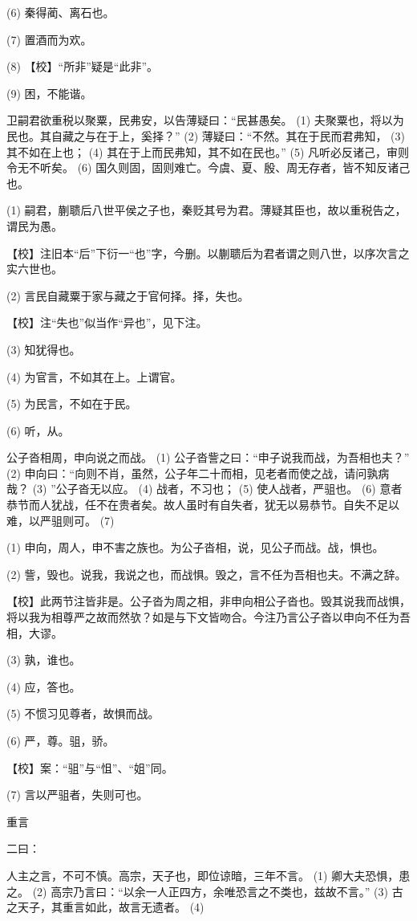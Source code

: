 \documentclass[12pt,UTF8]{ctexbook}
\begin{document}
(6) 秦得蔺、离石也。

(7) 置酒而为欢。

(8) 【校】“所非”疑是“此非”。

(9) 困，不能谐。

卫嗣君欲重税以聚粟，民弗安，以告薄疑曰：“民甚愚矣。 (1) 夫聚粟也，将以为民也。其自藏之与在于上，奚择？” (2) 薄疑曰：“不然。其在于民而君弗知， (3) 其不如在上也； (4) 其在于上而民弗知，其不如在民也。” (5) 凡听必反诸己，审则令无不听矣。 (6) 国久则固，固则难亡。今虞、夏、殷、周无存者，皆不知反诸己也。

(1) 嗣君，蒯聩后八世平侯之子也，秦贬其号为君。薄疑其臣也，故以重税告之，谓民为愚。

【校】注旧本“后”下衍一“也”字，今删。以蒯聩后为君者谓之则八世，以序次言之实六世也。

(2) 言民自藏粟于家与藏之于官何择。择，失也。

【校】注“失也”似当作“异也”，见下注。

(3) 知犹得也。

(4) 为官言，不如其在上。上谓官。

(5) 为民言，不如在于民。

(6) 听，从。

公子沓相周，申向说之而战。 (1) 公子沓訾之曰：“申子说我而战，为吾相也夫？” (2) 申向曰：“向则不肖，虽然，公子年二十而相，见老者而使之战，请问孰病哉？ (3) ”公子沓无以应。 (4) 战者，不习也； (5) 使人战者，严驵也。 (6) 意者恭节而人犹战，任不在贵者矣。故人虽时有自失者，犹无以易恭节。自失不足以难，以严驵则可。 (7)

(1) 申向，周人，申不害之族也。为公子沓相，说，见公子而战。战，惧也。

(2) 訾，毁也。说我，我说之也，而战惧。毁之，言不任为吾相也夫。不满之辞。

【校】此两节注皆非是。公子沓为周之相，非申向相公子沓也。毁其说我而战惧，将以我为相尊严之故而然欤？如是与下文皆吻合。今注乃言公子沓以申向不任为吾相，大谬。

(3) 孰，谁也。

(4) 应，答也。

(5) 不惯习见尊者，故惧而战。

(6) 严，尊。驵，骄。

【校】案：“驵”与“怚”、“姐”同。

(7) 言以严驵者，失则可也。





重言


二曰：

人主之言，不可不慎。高宗，天子也，即位谅暗，三年不言。 (1) 卿大夫恐惧，患之。 (2) 高宗乃言曰：“以余一人正四方，余唯恐言之不类也，兹故不言。” (3) 古之天子，其重言如此，故言无遗者。 (4)
\end{document}
